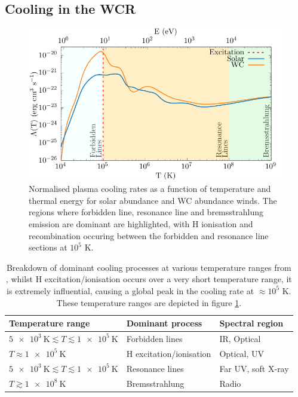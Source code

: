 \subsection{Cooling in the WCR}
\label{sec:wcrcooling}
\begin{figure}[h]
  \centering
  \includegraphics{assets/cooling-breakdown/cooling-curve-solar-withev.pdf}
  \caption[WC \& solar abundance plasma cooling curves]{Normalised plasma cooling rates as a function of temperature and thermal energy for solar abundance and WC abundance winds. The regions where forbidden line, resonance line and bremsstrahlung emission are dominant are highlighted, with H ionisation and recombination occuring between the forbidden and resonance line sections at $10^5$ \si{\kelvin}.}
  \label{fig:wcsolcooling}
\end{figure}

\begin{table}[h]
  \centering
  \begin{tabular}{lll}
  \\ \hline 
  \textbf{Temperature range} & \textbf{Dominant process} & \textbf{Spectral region} \\ \hline
  $\SI{5e3}{\kelvin} \lesssim T \lesssim \SI{1e5}{\kelvin} $ & Forbidden lines & IR, Optical \\
  $T \approx \SI{1e5}{\kelvin}$ & H excitation/ionisation & Optical, UV \\
  $\SI{5e3}{\kelvin} \lesssim T \lesssim \SI{1e5}{\kelvin} $ & Resonance lines & Far UV, soft X-ray \\
  $T \gtrsim \SI{1e8}{\kelvin} $ & Bremsstrahlung & Radio \\ \hline
  \end{tabular}
  \caption[Cooling processes at various temperature ranges]{Breakdown of dominant cooling processes at various temperature ranges from \cite{dysonPhysicsInterstellarMedium2021}, whilst H excitation/ionisation occurs over a very short temperature range, it is extremely influential, causing a global peak in the cooling rate at $\approx 10^5$ \si{\kelvin}. These temperature ranges are depicted in figure \ref{fig:wcsolcooling}.}
  \label{tab:coolprocess}
  \end{table}

